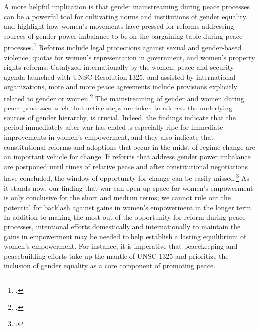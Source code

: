\documentclass [12pt] {article}
\begin{document}
A more helpful implication is that gender mainstreaming during peace processes can be a powerful tool for cultivating norms and institutions of gender equality.  \citeauthor{anderson2015windows} and \citeauthor{tripp2015women} highlight how women's movements have pressed for reforms addressing sources of gender power imbalance to be on the bargaining table during peace processes.\footnote{.}  Reforms include legal protections against sexual and gender-based violence, quotas for women's representation in government, and women's property rights reforms. Catalyzed internationally by the women, peace and security agenda launched with UNSC Resolution 1325, and assisted by international organizations, more and more peace agreements include provisions explicitly related to gender or women.\footnote{.} The mainstreaming of gender and women during peace processes, such that active steps are taken to address the underlying sources of gender hierarchy, is crucial. Indeed, the findings indicate that the period immediately after war has ended is especially ripe for immediate improvements in women's empowerment, and they also indicate that constitutional reforms and adoptions that occur in the midst of regime change are an important vehicle for change. If reforms that address gender power imbalance are postponed until times of relative peace and after constitutional negotiations have concluded, the window of opportunity for change can be easily missed.\footnote{.} As it stands now, our finding that war can open up space for women's empowerment is only conclusive for the short and medium terms; we cannot rule out the potential for backlash against gains in women's empowerment in the longer term. In addition to making the most out of the opportunity for reform during peace processes, intentional efforts domestically and internationally to maintain the gains in empowerment may be needed to help establish a lasting equilibrium of women's empowerment. For instance, it is imperative that peacekeeping and peacebuilding efforts take up the mantle of UNSC 1325 and prioritize the inclusion of gender equality as a core component of promoting peace.\\
\end{document}
